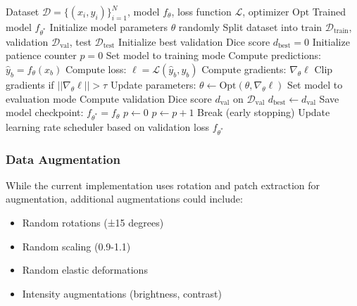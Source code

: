 \documentclass[12pt,a4paper]{article}
\begin{document}
\begin{algorithm}[H]
\caption{U-Net Training Algorithm}
\label{alg:training}
\begin{algorithmic}[1]
\REQUIRE Dataset $\mathcal{D} = \{(x_i, y_i)\}_{i=1}^N$, model $f_\theta$, loss function $\mathcal{L}$, optimizer $\text{Opt}$
\ENSURE Trained model $f_{\theta^*}$
\STATE Initialize model parameters $\theta$ randomly
\STATE Split dataset into train $\mathcal{D}_{\text{train}}$, validation $\mathcal{D}_{\text{val}}$, test $\mathcal{D}_{\text{test}}$
\STATE Initialize best validation Dice score $d_{\text{best}} = 0$
\STATE Initialize patience counter $p = 0$
    \STATE Set model to training mode
        \STATE Compute predictions: $\hat{y}_b = f_\theta(x_b)$
        \STATE Compute loss: $\ell = \mathcal{L}(\hat{y}_b, y_b)$
        \STATE Compute gradients: $\nabla_\theta \ell$
        \STATE Clip gradients if $||\nabla_\theta \ell|| > \tau$
        \STATE Update parameters: $\theta \leftarrow \text{Opt}(\theta, \nabla_\theta \ell)$
    \ENDFOR
    \STATE Set model to evaluation mode
    \STATE Compute validation Dice score $d_{\text{val}}$ on $\mathcal{D}_{\text{val}}$
        \STATE $d_{\text{best}} \leftarrow d_{\text{val}}$
        \STATE Save model checkpoint: $f_{\theta^*} = f_\theta$
        \STATE $p \leftarrow 0$
    \ELSE
        \STATE $p \leftarrow p + 1$
            \STATE Break (early stopping)
        \ENDIF
    \ENDIF
    \STATE Update learning rate scheduler based on validation loss
\ENDFOR
\RETURN $f_{\theta^*}$
\end{algorithmic}
\end{algorithm}

\subsubsection{Data Augmentation}
While the current implementation uses rotation and patch extraction for augmentation, additional augmentations could include:
\begin{itemize}
    \item Random rotations (±15 degrees)
    \item Random scaling (0.9-1.1)
    \item Random elastic deformations
    \item Intensity augmentations (brightness, contrast)
\end{itemize}
\end{document}
